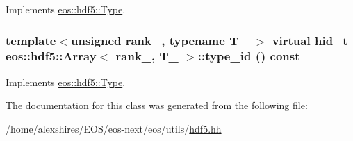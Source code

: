 Implements \hyperlink{structeos_1_1hdf5_1_1Type_a0cf79b090412bb228a1df8349acf3c2b}{eos::hdf5::Type}.\hypertarget{classeos_1_1hdf5_1_1Array_ac560c57df5f551234fd5ac77d1890d30}{
\subsubsection[{type\_\-id}]{\setlength{\rightskip}{0pt plus 5cm}template$<$unsigned rank\_\-, typename T\_\- $>$ virtual {\bf hid\_\-t} {\bf eos::hdf5::Array}$<$ rank\_\-, T\_\- $>$::type\_\-id () const}}
\label{classeos_1_1hdf5_1_1Array_ac560c57df5f551234fd5ac77d1890d30}


Implements \hyperlink{structeos_1_1hdf5_1_1Type_a0305c470a7a26a391f9a751e40bb9ff6}{eos::hdf5::Type}.

The documentation for this class was generated from the following file:\begin{DoxyCompactItemize}
\item 
/home/alexshires/EOS/eos-\/next/eos/utils/\hyperlink{hdf5_8hh}{hdf5.hh}\end{DoxyCompactItemize}
